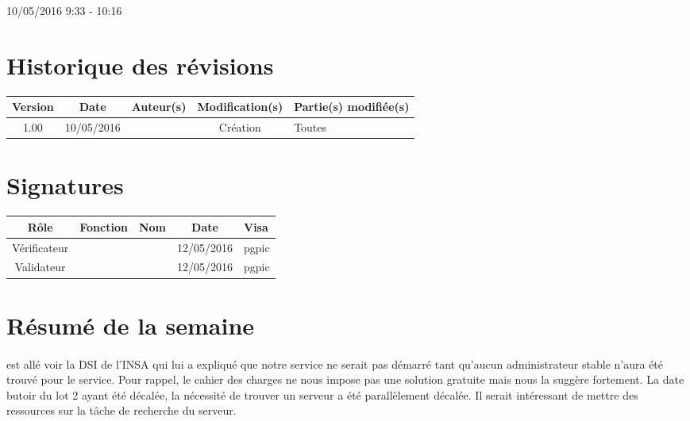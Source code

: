 \documentclass [a4paper] {article}
\begin{document}
\rhead{}

10/05/2016
\hfill   
\hfill 	9:33 - 10:16 				%



\section*{Historique des révisions}
\begin{center}
			\begin{tabular}{| c | c | c | c | p{4cm} |}
				\hline
				\rowcolor{Gray}
				Version & Date & Auteur(s) & Modification(s) & Partie(s) modifiée(s)		 \\
				\hline
				1.00 & 10/05/2016 & \Pierre & Création & Toutes \\
		\hline		
			\end{tabular}
		\end{center}

\section*{Signatures}

		\begin{center}
			\begin{tabular}{| c | c | c | c | p{4cm} |}
				\hline
				\rowcolor{Gray}
				Rôle & Fonction & Nom & Date & Visa		 \\
				\hline
				Vérificateur & \RQA & \Kafui & 12/05/2016 & pgpic \\[30pt]
				\hline
				Validateur & \CP & \Sergi & 12/05/2016 & pgpic \\[30pt]	
				\hline
			\end{tabular}
		\end{center}


\section{Résumé de la semaine}
\paragraph*{}
\Sergi{} est allé voir la DSI de l'INSA qui lui a expliqué que notre service ne serait pas démarré tant qu'aucun administrateur stable n'aura été trouvé pour le service. Pour rappel, le cahier des charges ne nous impose pas une solution gratuite mais nous la suggère fortement. La date butoir du lot 2 ayant été décalée, la nécessité de trouver un serveur a été parallèlement décalée. Il serait intéressant de mettre des ressources sur la tâche de recherche du serveur.
\end{document}
